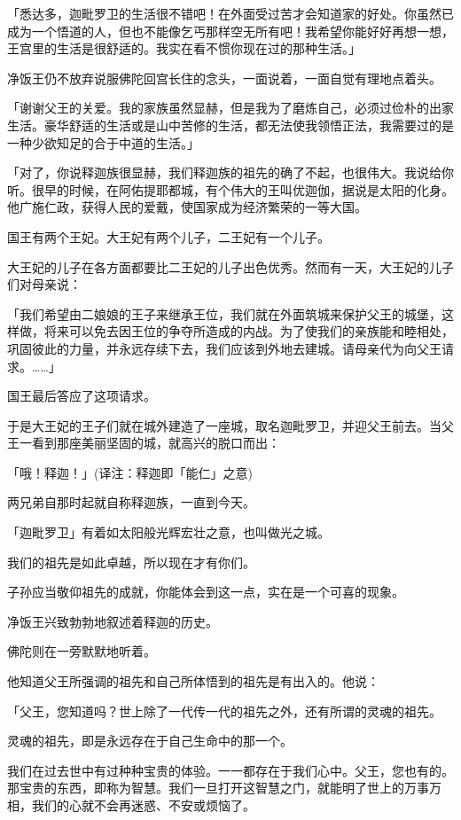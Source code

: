 \documentclass[twoside,openany]{book}
\begin{document}
「悉达多，迦毗罗卫的生活很不错吧！在外面受过苦才会知道家的好处。你虽然已成为一个悟道的人，但也不能像乞丐那样空无所有吧！我希望你能好好再想一想，王宫里的生活是很舒适的。我实在看不惯你现在过的那种生活。」

净饭王仍不放弃说服佛陀回宫长住的念头，一面说着，一面自觉有理地点着头。

「谢谢父王的关爱。我的家族虽然显赫，但是我为了磨炼自己，必须过俭朴的出家生活。豪华舒适的生活或是山中苦修的生活，都无法使我领悟正法，我需要过的是一种少欲知足的合于中道的生活。」

「对了，你说释迦族很显赫，我们释迦族的祖先的确了不起，也很伟大。我说给你听。很早的时候，在阿佑提耶都城，有个伟大的王叫优迦伽，据说是太阳的化身。他广施仁政，获得人民的爱戴，使国家成为经济繁荣的一等大国。

国王有两个王妃。大王妃有两个儿子，二王妃有一个儿子。

大王妃的儿子在各方面都要比二王妃的儿子出色优秀。然而有一天，大王妃的儿子们对母亲说：

「我们希望由二娘娘的王子来继承王位，我们就在外面筑城来保护父王的城堡，这样做，将来可以免去因王位的争夺所造成的内战。为了使我们的亲族能和睦相处，巩固彼此的力量，并永远存续下去，我们应该到外地去建城。请母亲代为向父王请求。……」

国王最后答应了这项请求。

于是大王妃的王子们就在城外建造了一座城，取名迦毗罗卫，并迎父王前去。当父王一看到那座美丽坚固的城，就高兴的脱口而出：

「哦！释迦！」(译注：释迦即「能仁」之意)

两兄弟自那时起就自称释迦族，一直到今天。

「迦毗罗卫」有着如太阳般光辉宏壮之意，也叫做光之城。

我们的祖先是如此卓越，所以现在才有你们。

子孙应当敬仰祖先的成就，你能体会到这一点，实在是一个可喜的现象。

净饭王兴致勃勃地叙述着释迦的历史。

佛陀则在一旁默默地听着。

他知道父王所强调的祖先和自己所体悟到的祖先是有出入的。他说：

「父王，您知道吗？世上除了一代传一代的祖先之外，还有所谓的灵魂的祖先。

灵魂的祖先，即是永远存在于自己生命中的那一个。

我们在过去世中有过种种宝贵的体验。一一都存在于我们心中。父王，您也有的。那宝贵的东西，即称为智慧。我们一旦打开这智慧之门，就能明了世上的万事万相，我们的心就不会再迷惑、不安或烦恼了。
\end{document}
